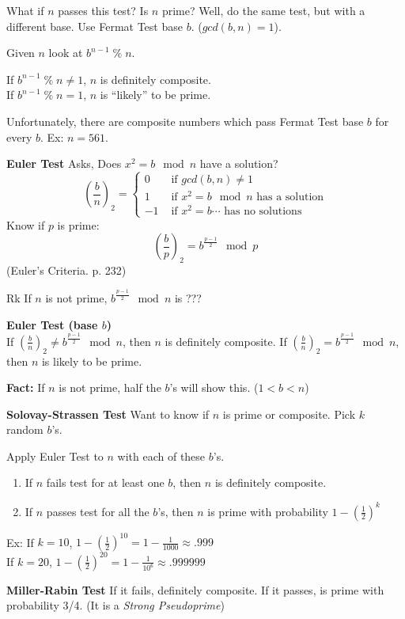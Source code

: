 What if $n$ passes this test? Is $n$ prime? Well, do the same test, but with a different base. Use Fermat Test base $b$. ($gcd(b,n) = 1$).

Given $n$ look at $b^{n-1} \;\%\; n$.

If $b^{n-1} \;\%\; n \neq 1$, $n$ is definitely composite.\\
If $b^{n-1} \;\%\; n = 1$, $n$ is ``likely'' to be prime.

Unfortunately, there are composite numbers which pass Fermat Test base $b$ for every $b$. Ex: $n=561$.

\textbf{Euler Test} Asks, Does $x^2=b \mod n$ have a solution?
\[
\left(\frac{b}{n}\right)_2 = \begin{cases}
0 & \mbox{ if } gcd(b,n) \neq 1 \\
1 & \mbox{ if } x^2 = b \mod n \mbox{ has a solution} \\
-1 & \mbox{ if } x^2 = b \cdots \mbox{ has no solutions}
\end{cases}
\]
Know if $p$ is prime:
\[
\left(\frac{b}{p}\right)_2 = b^{\frac{p-1}{2}} \mod p
\]
(Euler's Criteria. p. 232)

Rk If $n$ is not prime, $b^{\frac{p-1}{2}} \mod n$ is ???

\textbf{Euler Test (base $b$)}\\
If $\left(\frac{b}{n}\right)_2 \neq b^{\frac{p-1}{2}} \mod n$, then $n$ is definitely composite.
If $\left(\frac{b}{n}\right)_2 = b^{\frac{p-1}{2}} \mod n$, then $n$ is likely to be prime.

\textbf{Fact:} If $n$ is not prime, half the $b$'s will show this. ($1<b<n$)

\textbf{Solovay-Strassen Test} Want to know if $n$ is prime or composite. Pick $k$ random $b$'s.

Apply Euler Test to $n$ with each of these $b$'s.
\begin{enumerate}
\item If $n$ fails test for at least one $b$, then $n$ is definitely composite.

\item If $n$ passes test for all the $b$'s, then $n$ is prime with probability $1 - (\frac{1}{2})^k$
\end{enumerate}

Ex: If $k = 10$, $1 - (\frac{1}{2})^{10} = 1 - \frac{1}{1000} \approx .999$\\
If $k = 20$, $1 - (\frac{1}{2})^{20} = 1 - \frac{1}{10^6} \approx .999999$

\textbf{Miller-Rabin Test} If it fails, definitely composite. If it passes, is prime with probability 3/4. (It is a \textit{Strong Pseudoprime})

